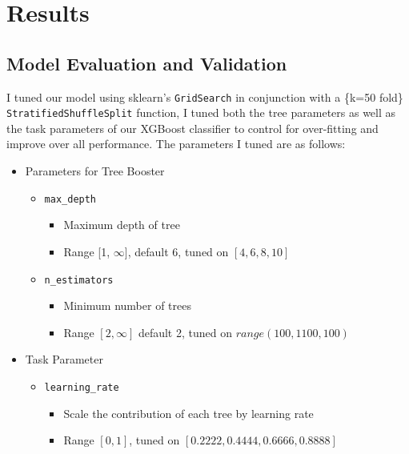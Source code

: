 
\chapter*{Results}


\section*{Model Evaluation and Validation}

I tuned our model using sklearn's \texttt{GridSearch} in conjunction with a \{k=50 fold\} \texttt{StratifiedShuffleSplit} function, I tuned both the tree parameters as well as the task parameters of our XGBoost classifier to control for over-fitting and improve over all performance. The parameters I tuned are as follows:

\begin{itemize}
\item Parameters for Tree Booster
    \begin{itemize}
        \item \texttt{max\_depth}
        \begin{itemize}
            \item Maximum depth of tree
            \item Range [1, $\infty$], default 6, tuned on $[4, 6, 8, 10]$
        \end{itemize}
        \item \texttt{n\_estimators}
        \begin{itemize}
            \item Minimum number of trees
            \item Range $[2,\infty]$ default 2, tuned on $range(100, 1100, 100)$
        \end{itemize}

    \end{itemize}

\item Task Parameter
    \begin{itemize}
        \item \texttt{learning\_rate}
        \begin{itemize}
            \item Scale the contribution of each tree by learning rate
            \item Range $[0, 1]$, tuned on $[0.2222, 0.4444, 0.6666, 0.8888]$
        \end{itemize}
    \end{itemize}
\end{itemize}

